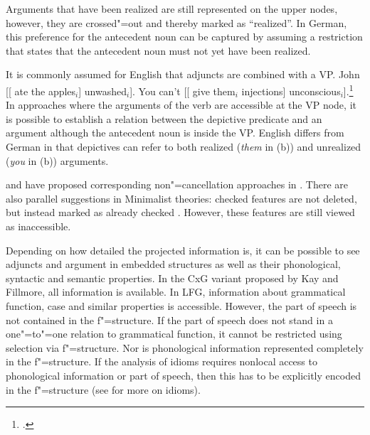 Arguments that have been realized are still represented on the upper nodes, however, they are crossed"=out and thereby marked as ``realized''.
In German, this preference for the antecedent noun can be captured by assuming a restriction that states that the antecedent noun must not yet have been
realized.

It is commonly assumed for English that adjuncts are combined with a VP.
\eal
\ex John [[ ate the apples$_i$] unwashed$_i$].
\ex You can't [[ give them$_i$ injections] unconscious$_i$].\footnote{
.
}
\zl
In approaches where the arguments of the verb are accessible at the VP node, it is possible to establish a relation between
the depictive predicate and an argument although the antecedent noun is inside the VP.
English differs from German in that depictives can refer to both realized (\emph{them} in (b))
and unrealized (\emph{you} in (b)) arguments.

\citet[]{Higginbotham85a} and \citet{Winkler97a} have proposed corresponding non"=cancellation approaches in \gbt.
There are also parallel suggestions in Minimalist theories: checked features are not deleted, but instead marked as already
checked \citep[]{Stabler2010b}. However, these features are still viewed as inaccessible.\label{page-non-cancellation-end}

Depending on how detailed the projected information is, it can be possible to see adjuncts and argument in embedded structures as well as their
phonological, syntactic and semantic properties. In the CxG variant proposed by Kay and Fillmore, all information is available. In LFG,
information about grammatical function, case and similar properties is accessible. However, the part of speech is not contained in the f"=structure.
If the part of speech does not stand in a one"=to"=one relation to grammatical function, it cannot be restricted using selection via f"=structure.
Nor is phonological information represented completely in the f"=structure. If the analysis of idioms requires nonlocal access to phonological
information or part of speech, then this has to be explicitly encoded in the f"=structure (see  for more on idioms). 

